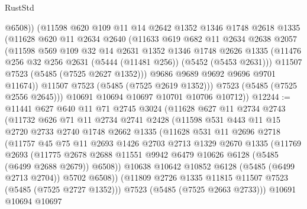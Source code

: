 \begin{lexlean}{RustStd}
\begin{coremodule}
              @6508))
          (@11598
            @620
            @109
            @11
            @14
            @2642
            @1352
            @1346
            @1748
            @2618
            @1335
            (@11628
              @620
              @11
              @2634
              @2640
              (@11633
                @619
                @682
                @11
                @2634
                @2638
                @2057
                (@11598
                  @569
                  @109
                  @32
                  @14
                  @2631
                  @1352
                  @1346
                  @1748
                  @2626
                  @1335
                  (@11476 @256 @32 @256 @2631 (@5444 (@11481 @256)) (@5452 (@5453 @2631)))
                  @11507
                  @7523
                  (@5485 (@7525 @2627 @1352)))
                @9686
                @9689
                @9692
                @9696
                @9701
                @11674))
            @11507
            @7523
            (@5485 (@7525 @2619 @1352)))
          @7523
          (@5485 (@7525 @2556 @2645)))
        @10691
        @10694
        @10697
        @10701
        @10706
        @10712))
@12244 := @11441
    @627
    @640
    @11
    @71
    @2745
    @3024
    (@11628
      @627
      @11
      @2734
      @2743
      (@11732
        @626
        @71
        @11
        @2734
        @2741
        @2428
        (@11598
          @531
          @443
          @11
          @15
          @2720
          @2733
          @2740
          @1748
          @2662
          @1335
          (@11628
            @531
            @11
            @2696
            @2718
            (@11757
              @45
              @75
              @11
              @2693
              @1426
              @2703
              @2713
              @1329
              @2670
              @1335
              (@11769
                @2693
                (@11775
                  @2678
                  @2688
                  @11551
                  @9942
                  @6479
                  @10626
                  @6128
                  (@5485 (@6499 @2688 @2679))
                  @6508))
              @10638
              @10642
              @10852
              @6128
              (@5485 (@6499 @2713 @2704))
              @5702
              @6508))
          (@11809 @2726 @1335 @11815 @11507 @7523 (@5485 (@7525 @2727 @1352)))
          @7523
          (@5485 (@7525 @2663 @2733)))
        @10691
        @10694
        @10697

\end{coremodule}
\end{lexlean}
